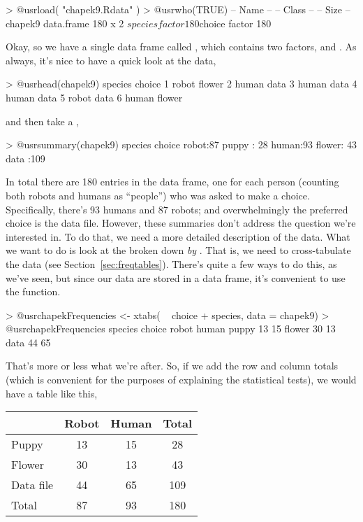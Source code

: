 \begin{rblock1}
> @usr{load( "chapek9.Rdata" )}
> @usr{who(TRUE)}
   -- Name --   -- Class --   -- Size --
   chapek9      data.frame    180 x 2   
    $species    factor        180       
    $choice     factor        180            
\end{rblock1}
Okay, so we have a single data frame called , which contains two factors,  and . As always, it's nice to have a quick look at the data,
\begin{rblock1}     
> @usr{head(chapek9)}
  species choice
1   robot flower
2   human   data
3   human   data
4   human   data
5   robot   data
6   human flower
\end{rblock1}
and then take a ,
\begin{rblock1}
> @usr{summary(chapek9)}
  species      choice   
 robot:87   puppy : 28  
 human:93   flower: 43  
            data  :109  
\end{rblock1}
In total there are 180 entries in the data frame, one for each person (counting both robots and humans as ``people'') who was asked to make a choice. Specifically, there's 93 humans and 87 robots; and overwhelmingly the preferred choice is the data file. However, these summaries don't address the question we're interested in. To do that, we need a more detailed description of the data. What we want to do is look at the  broken down {\it by} . That is, we need to cross-tabulate the data (see Section~\ref{sec:freqtables}). There's quite a few ways to do this, as we've seen, but since our data are stored in a data frame, it's convenient to use the  function. 
\begin{rblock1}
> @usr{chapekFrequencies <- xtabs( ~ choice + species, data = chapek9)}
> @usr{chapekFrequencies}
        species
choice   robot human
  puppy     13    15
  flower    30    13
  data      44    65
\end{rblock1}
That's more or less what we're after. So, if we add the row and column totals (which is convenient for the purposes of explaining the statistical tests), we would have a table like this,
\begin{center}
\begin{tabular}{l|cc|c}
          & Robot & Human & Total \\ \hline
Puppy     & 13  & 15 & 28 \\
Flower    & 30  & 13 & 43 \\
Data file & 44  & 65 & 109 \\ \hline
Total     & 87 & 93 & 180
\end{tabular}
\end{center}
